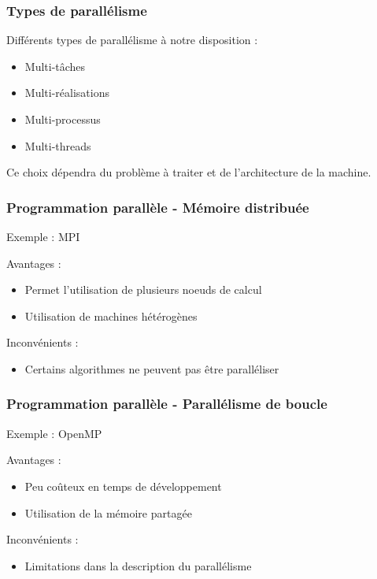\documentclass{beamer}
\begin{document}
\begin{frame}
  \frametitle{Types de parallélisme}

  Différents types de parallélisme à notre disposition :
  \begin{itemize}
    \item Multi-tâches
    \item Multi-réalisations
    \item Multi-processus
    \item Multi-threads
  \end{itemize}

  Ce choix dépendra du problème à traiter et de l'architecture de la machine.
\end{frame}



\begin{frame}
  \frametitle{Programmation parallèle - Mémoire distribuée}
  Exemple : MPI
  \bigskip

  Avantages :
  \begin{itemize}
    \item Permet l'utilisation de plusieurs noeuds de calcul
    \item Utilisation de machines hétérogènes
  \end{itemize}

  Inconvénients :
  \begin{itemize}
    \item Certains algorithmes ne peuvent pas être paralléliser
  \end{itemize}
\end{frame}



\begin{frame}
  \frametitle{Programmation parallèle - Parallélisme de boucle}
  Exemple : OpenMP
  \bigskip

  Avantages :
  \begin{itemize}
    \item Peu coûteux en temps de développement
    \item Utilisation de la mémoire partagée
  \end{itemize}

  Inconvénients :
  \begin{itemize}
    \item Limitations dans la description du parallélisme
  \end{itemize}
\end{frame}
\end{document}
